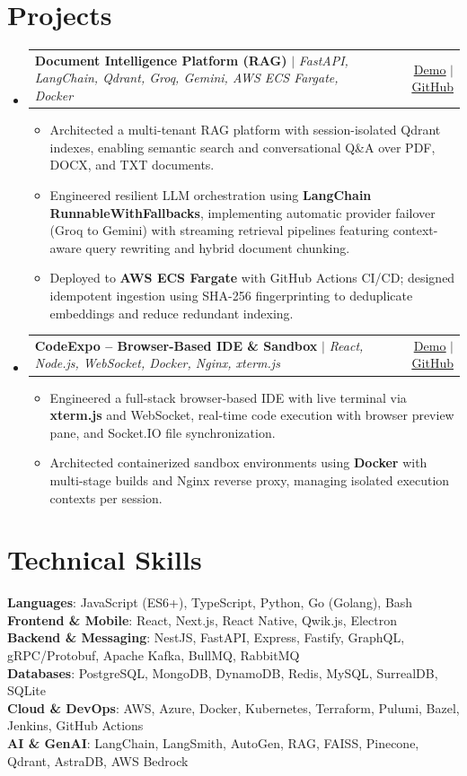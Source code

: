 \documentclass[letterpaper,11pt]{article}
\makeatletter
\newcommand{\resumeItem}[1]{
  \item\small{#1 \vspace{-2pt}}
}
\newcommand{\resumeProjectHeading}[2]{
    \item
    \begin{tabular*}{0.97\textwidth}{l@{\extracolsep{\fill}}r}
      \small#1 & #2 \\
    \end{tabular*}\vspace{-7pt}
}
\newcommand{\resumeSubHeadingListStart}{\begin{itemize}[leftmargin=0.15in, label={}]}
\newcommand{\resumeSubHeadingListEnd}{\end{itemize}}
\newcommand{\resumeItemListStart}{\begin{itemize}}
\newcommand{\resumeItemListEnd}{\end{itemize}\vspace{-5pt}}
\makeatother
\begin{document}
\section{Projects}
    \resumeSubHeadingListStart
      \resumeProjectHeading
          {\textbf{Document Intelligence Platform (RAG)} $|$ \emph{\small FastAPI, LangChain, Qdrant, Groq, Gemini, AWS ECS Fargate, Docker}}{\href{https://harshsaw.me}{\underline{Demo}} $|$ \href{https://github.com/harshsaw}{\underline{GitHub}}}
          \resumeItemListStart
            \resumeItem{Architected a multi-tenant RAG platform with session-isolated Qdrant indexes, enabling semantic search and conversational Q\&A over PDF, DOCX, and TXT documents.}
            \resumeItem{Engineered resilient LLM orchestration using \textbf{LangChain RunnableWithFallbacks}, implementing automatic provider failover (Groq to Gemini) with streaming retrieval pipelines featuring context-aware query rewriting and hybrid document chunking.}
            \resumeItem{Deployed to \textbf{AWS ECS Fargate} with GitHub Actions CI/CD; designed idempotent ingestion using SHA-256 fingerprinting to deduplicate embeddings and reduce redundant indexing.}
          \resumeItemListEnd
      \resumeProjectHeading
          {\textbf{CodeExpo -- Browser-Based IDE \& Sandbox} $|$ \emph{\small React, Node.js, WebSocket, Docker, Nginx, xterm.js}}{\href{https://harshsaw.me}{\underline{Demo}} $|$ \href{https://github.com/harshsaw}{\underline{GitHub}}}
          \resumeItemListStart
            \resumeItem{Engineered a full-stack browser-based IDE with live terminal via \textbf{xterm.js} and WebSocket, real-time code execution with browser preview pane, and Socket.IO file synchronization.}
            \resumeItem{Architected containerized sandbox environments using \textbf{Docker} with multi-stage builds and Nginx reverse proxy, managing isolated execution contexts per session.}
          \resumeItemListEnd
    \resumeSubHeadingListEnd

\section{Technical Skills}
 \begin{itemize}[leftmargin=0.15in, label={}]
    \small{\item{
     \textbf{Languages}{: JavaScript (ES6+), TypeScript, Python, Go (Golang), Bash} \\
     \textbf{Frontend \& Mobile}{: React, Next.js, React Native, Qwik.js, Electron} \\
     \textbf{Backend \& Messaging}{: NestJS, FastAPI, Express, Fastify, GraphQL, gRPC/Protobuf, Apache Kafka, BullMQ, RabbitMQ} \\
     \textbf{Databases}{: PostgreSQL, MongoDB, DynamoDB, Redis, MySQL, SurrealDB, SQLite} \\
     \textbf{Cloud \& DevOps}{: AWS, Azure, Docker, Kubernetes, Terraform, Pulumi, Bazel, Jenkins, GitHub Actions} \\
     \textbf{AI \& GenAI}{: LangChain, LangSmith, AutoGen, RAG, FAISS, Pinecone, Qdrant, AstraDB, AWS Bedrock}
    }}
 \end{itemize}
\end{document}
